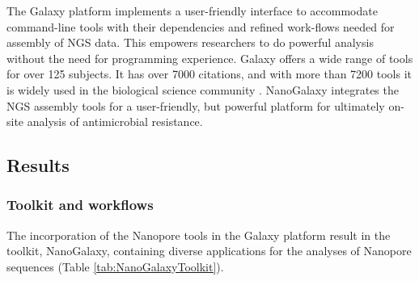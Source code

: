 \documentclass[a4paper,num-refs]{oup-contemporary}
\begin{document}
The Galaxy platform implements a user-friendly interface to accommodate command-line tools with their dependencies and refined work-flows needed for assembly of NGS data. This empowers researchers to do powerful analysis without the need for programming experience. Galaxy offers a wide range of tools for over 125 subjects. It has over 7000 citations, and with more than 7200 tools it is widely used in the biological science community \cite{galaxycitations, galaxytoolshed}. NanoGalaxy integrates the NGS assembly tools for a user-friendly, but powerful platform for ultimately on-site analysis of antimicrobial resistance.


\subsection{Results}

\subsubsection{Toolkit and workflows}
The incorporation of the Nanopore tools in the Galaxy platform result in the toolkit, NanoGalaxy, containing diverse
applications for the analyses of Nanopore sequences (Table \ref{tab:NanoGalaxyToolkit}).
\end{document}
